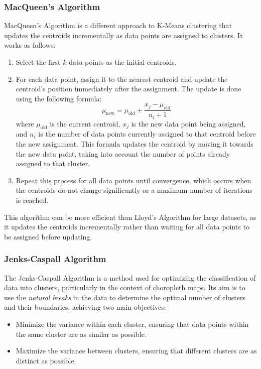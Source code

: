 \subsubsection{MacQueen's Algorithm}
MacQueen's Algorithm is a different approach to K-Means clustering that updates the centroids incrementally as data points are assigned to clusters. It works as follows:
\begin{enumerate}
    \item Select the first $k$ data points as the initial centroids.
    \item For each data point, assign it to the nearest centroid and update the centroid's position immediately after the assignment. The update is done using the following formula:
    \begin{equation*}
        \mu_{\text{new}} = \mu_{\text{old}} + \frac{x_j - \mu_{\text{old}}}{n_i + 1}
    \end{equation*}
    where $\mu_{\text{old}}$ is the current centroid, $x_j$ is the new data point being assigned, and $n_i$ is the number of data points currently assigned to that centroid before the new assignment. This formula updates the centroid by moving it towards the new data point, taking into account the number of points already assigned to that cluster.
    \item Repeat this process for all data points until convergence, which occurs when the centroids do not change significantly or a maximum number of iterations is reached.
\end{enumerate}

This algorithm can be more efficient than Lloyd's Algorithm for large datasets, as it updates the centroids incrementally rather than waiting for all data points to be assigned before updating.

\subsubsection{Jenks-Caspall Algorithm}

The Jenks-Caspall Algorithm is a method used for optimizing the classification of data into clusters, particularly in the context of choropleth maps. Its aim is to use the \emph{natural breaks} in the data to determine the optimal number of clusters and their boundaries, achieving two main objectives:
\begin{itemize}
    \item Minimize the variance within each cluster, ensuring that data points within the same cluster are as similar as possible.
    \item Maximize the variance between clusters, ensuring that different clusters are as distinct as possible.
\end{itemize}

